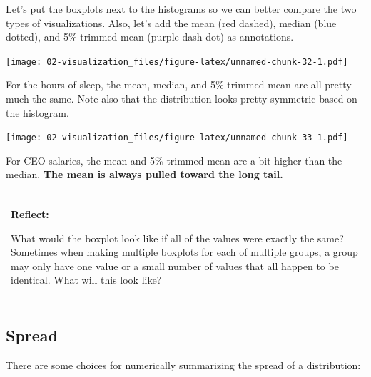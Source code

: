 \documentclass[
]{book}
\newenvironment{reflect}
{
    \begin{center}
    
    \begin{tabular}{|p{0.8\textwidth}|}
    \rowcolor{LightBlue}
    \hline\\
    \rowcolor{LightBlue}
    \textbf{Reflect:}
}
{
    \\\rowcolor{LightBlue}
    \\\hline
    \end{tabular} 
    \end{center}
}
\begin{document}
Let's put the boxplots next to the histograms so we can better compare the two types of visualizations. Also, let's add the mean (red dashed), median (blue dotted), and 5\% trimmed mean (purple dash-dot) as annotations.

\texttt{[image: 02-visualization\_files/figure-latex/unnamed-chunk-32-1.pdf]}

For the hours of sleep, the mean, median, and 5\% trimmed mean are all pretty much the same. Note also that the distribution looks pretty symmetric based on the histogram.

\texttt{[image: 02-visualization\_files/figure-latex/unnamed-chunk-33-1.pdf]}

For CEO salaries, the mean and 5\% trimmed mean are a bit higher than the median. \textbf{The mean is always pulled toward the long tail.}

\begin{reflect}
What would the boxplot look like if all of the values were exactly the
same? Sometimes when making multiple boxplots for each of multiple
groups, a group may only have one value or a small number of values that
all happen to be identical. What will this look like?
\end{reflect}

\hypertarget{spread}{%
\subsection{Spread}\label{spread}}

There are some choices for numerically summarizing the spread of a distribution:
\end{document}
